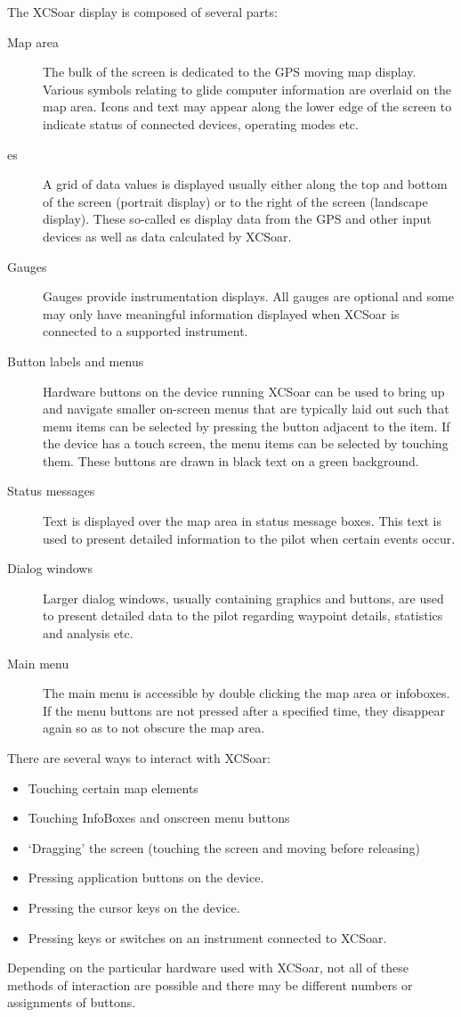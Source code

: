 \documentclass[a4paper,12pt]{refrep}
\begin{document}
The XCSoar display is composed of several parts:
\begin{description}
\item[Map area] The bulk of the screen is dedicated to the GPS moving map
display. Various symbols relating to glide computer information are overlaid 
on the map area. Icons and text may appear along the lower edge of the screen
to indicate status of connected devices, operating modes etc.
\item[{\InfoBox}es] A grid of data values is displayed usually either along
the top and bottom of the screen (portrait display) or to the right of the
screen (landscape display).  These so-called {\InfoBox}es display data from the
GPS and other input devices as well as data calculated by XCSoar.
\item[Gauges]  Gauges provide instrumentation displays. All gauges are optional
and some may only have meaningful information displayed when XCSoar is
connected to a supported instrument.
\item[Button labels and menus] Hardware buttons on the device running XCSoar
can be used to bring up and navigate smaller on-screen menus that are
typically laid out such that menu items can be selected by pressing the
button adjacent to the item.  If the device has a touch screen, the menu
items can be selected by touching them.  These buttons are drawn in black
text on a green background.
\item[Status messages] Text is displayed over the map area in status message
boxes.  This text is used to present detailed information to the pilot when
certain events occur.
\item[Dialog windows] Larger dialog windows, usually containing graphics and
buttons, are used to present detailed data to the pilot regarding waypoint
details, statistics and analysis etc.
\item[Main menu] The main menu is accessible by double clicking the map area or
infoboxes. If the menu buttons are not pressed after a specified time, they 
disappear again so as to not obscure the map area.
\end{description}

There are several ways to interact with XCSoar:
\begin{itemize}
\item Touching certain map elements
\item Touching InfoBoxes and onscreen menu buttons
\item `Dragging' the screen (touching the screen and moving before releasing)
\item Pressing application buttons on the device.
\item Pressing the cursor keys on the device.
\item Pressing keys or switches on an instrument connected to XCSoar.
\end{itemize}
Depending on the particular hardware used with XCSoar, not all of these methods
of interaction are possible and there may be different numbers or assignments
of buttons.
\end{document}
